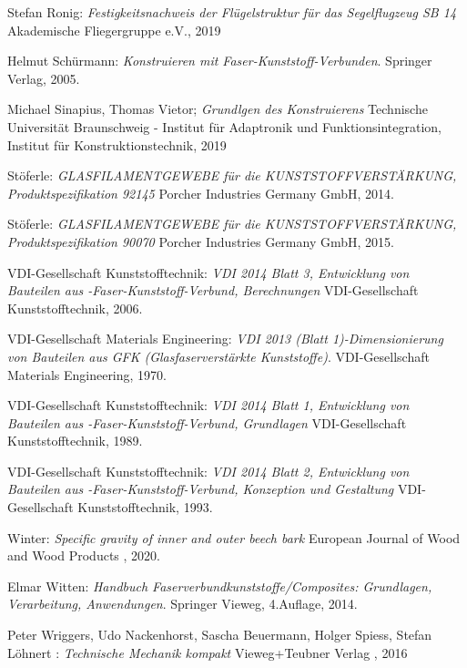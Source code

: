 \begin{thebibliography}{99}
	Stefan Ronig:
	\textit{Festigkeitsnachweis der Flügelstruktur für das Segelflugzeug SB 14}
	Akademische Fliegergruppe e.V., 2019
	
	Helmut Schürmann:
	\textit {Konstruieren mit Faser-Kunststoff-Verbunden}.
	Springer Verlag, 2005.
	
	Michael Sinapius, Thomas Vietor;
	\textit{Grundlgen des Konstruierens}	
	Technische Universität Braunschweig - Institut für Adaptronik und Funktionsintegration, Institut für Konstruktionstechnik, 2019
	
	Stöferle:
	\textit{GLASFILAMENTGEWEBE für die KUNSTSTOFFVERSTÄRKUNG, Produktspezifikation 92145}
	Porcher Industries Germany GmbH, 2014.
	
	Stöferle:
	\textit{GLASFILAMENTGEWEBE für die KUNSTSTOFFVERSTÄRKUNG, Produktspezifikation 90070}
	Porcher Industries Germany GmbH, 2015.
	
	VDI-Gesellschaft Kunststofftechnik:
	\textit{VDI 2014 Blatt 3, Entwicklung von Bauteilen aus -Faser-Kunststoff-Verbund, Berechnungen}
	VDI-Gesellschaft Kunststofftechnik, 2006.
	
	VDI-Gesellschaft Materials Engineering:
	\textit{VDI 2013 (Blatt 1)-Dimensionierung von Bauteilen aus GFK (Glasfaserverstärkte Kunststoffe)}.
	VDI-Gesellschaft Materials Engineering, 1970.
	
	VDI-Gesellschaft Kunststofftechnik:
	\textit{VDI 2014 Blatt 1, Entwicklung von Bauteilen aus -Faser-Kunststoff-Verbund, Grundlagen}
	VDI-Gesellschaft Kunststofftechnik, 1989.
	
	VDI-Gesellschaft Kunststofftechnik:
	\textit{VDI 2014 Blatt 2, Entwicklung von Bauteilen aus -Faser-Kunststoff-Verbund, Konzeption und Gestaltung}
	VDI-Gesellschaft Kunststofftechnik, 1993.
	
	Winter:
	\textit{Specific gravity of inner and outer beech bark}
	European Journal of Wood and Wood Products , 2020.
	
	Elmar Witten:
	\textit {Handbuch Faserverbundkunststoffe/Composites: Grundlagen, Verarbeitung, Anwendungen}.
	Springer Vieweg, 4.Auflage, 2014.
	
	Peter Wriggers, Udo Nackenhorst, Sascha Beuermann, Holger Spiess, Stefan Löhnert :
	\textit{Technische Mechanik kompakt}
	Vieweg+Teubner Verlag , 2016

\end{thebibliography}
\endgroup